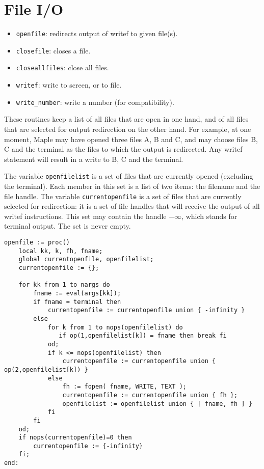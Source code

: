 \documentclass[a4paper,10pt]{article}
\begin{document}
\section{File I/O}

\begin{itemize}
\item   \verb+openfile+: redirects output of writef to given file(s).
\item   \verb+closefile+: closes a file.
\item   \verb+closeallfiles+: close all files.
\item   \verb+writef+: write to screen, or to file.
\item   \verb+write_number+: write a number (for compatibility).
\end{itemize}

These routines keep a list of all files that are open in one hand, and of all files
that are selected for output redirection on the other hand.  For example, at one
moment, Maple may have opened three files A, B and C, and may choose files B, C and the terminal
as the files to which the output is redirected.  Any writef statement will result in a write
to B, C and the terminal.

The variable \verb+openfilelist+ is a set of files that are currently opened (excluding the terminal).
Each member in this set is a list of two items: the filename and the file handle.  The variable
\verb+currentopenfile+ is a set of files that are currently selected for redirection: it is a set
of file handles that will receive the output of all writef instructions.  This set may contain the
handle $-\infty$, which stands for terminal output.  The set is never empty.

\begin{lstlisting}[name=tools]
openfile := proc()
    local kk, k, fh, fname;
    global currentopenfile, openfilelist;
    currentopenfile := {};

    for kk from 1 to nargs do
        fname := eval(args[kk]);
        if fname = terminal then
            currentopenfile := currentopenfile union { -infinity }
        else
            for k from 1 to nops(openfilelist) do
               if op(1,openfilelist[k]) = fname then break fi
            od;
            if k <= nops(openfilelist) then
                currentopenfile := currentopenfile union { op(2,openfilelist[k]) }
            else
                fh := fopen( fname, WRITE, TEXT );
                currentopenfile := currentopenfile union { fh };
                openfilelist := openfilelist union { [ fname, fh ] }
            fi
        fi
    od;
    if nops(currentopenfile)=0 then
        currentopenfile := {-infinity}
    fi;
end:
\end{lstlisting}
\end{document}
